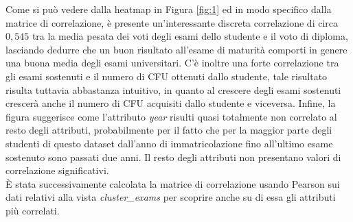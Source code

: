 \documentclass[]{article}
\begin{document}
\begin{center}
\end{center}

Come si pu\`{o} vedere dalla heatmap in Figura \ref{fig:1} ed in modo specifico dalla matrice di correlazione, \`{e} presente un'interessante  discreta correlazione di circa $0,545$ tra la media pesata dei voti degli esami dello studente e il voto di diploma, lasciando dedurre che un buon risultato all'esame di maturit\`{a} comporti in genere una buona media degli esami universitari. C'\`{e} inoltre una forte correlazione tra gli esami sostenuti e il numero di CFU ottenuti dallo studente, tale risultato risulta tuttavia abbastanza intuitivo, in quanto al crescere degli esami sostenuti crescer\`{a} anche il numero di CFU acquisiti dallo studente e viceversa. Infine, la figura suggerisce come l'attributo \textit{year} risulti quasi totalmente non correlato al resto degli attributi, probabilmente per il fatto che per la maggior parte degli studenti di questo dataset dall'anno di immatricolazione fino all'ultimo esame sostenuto sono passati due anni. Il resto degli attributi non presentano valori di correlazione significativi.\\

\`{E} stata successivamente calcolata la matrice di correlazione usando Pearson sui dati relativi alla vista \textit{cluster\_exams} per scoprire anche su di essa gli attributi pi\`{u} correlati.
\end{document}
